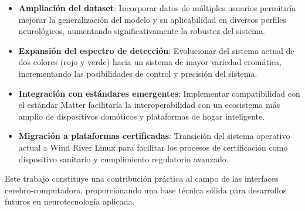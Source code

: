 \begin{itemize}
    \item \textbf{Ampliación del dataset}: Incorporar datos de múltiples usuarios permitiría mejorar la generalización del modelo y su aplicabilidad en diversos perfiles neurológicos, aumentando significativamente la robustez del sistema.
    
    \item \textbf{Expansión del espectro de detección}: Evolucionar del sistema actual de dos colores (rojo y verde) hacia un sistema de mayor variedad cromática, incrementando las posibilidades de control y precisión del sistema.
    
    \item \textbf{Integración con estándares emergentes}: Implementar compatibilidad con el estándar Matter facilitaría la interoperabilidad con un ecosistema más amplio de dispositivos domóticos y plataformas de hogar inteligente.
    
    \item \textbf{Migración a plataformas certificadas}: Transición del sistema operativo actual a Wind River Linux para facilitar los procesos de certificación como dispositivo sanitario y cumplimiento regulatorio avanzado.
\end{itemize}

Este trabajo constituye una contribución práctica al campo de las interfaces cerebro-computadora, proporcionando una base técnica sólida para desarrollos futuros en neurotecnología aplicada.
